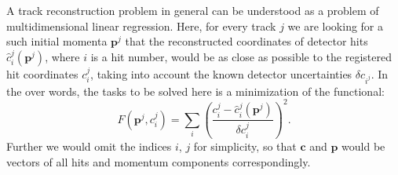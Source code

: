 %
%

A track reconstruction  problem in general can be understood as a problem of multidimensional linear regression.
Here, for every track $j$ we are looking for a such initial momenta $\boldsymbol{p}^j$ that the reconstructed coordinates of detector 
hits $\hat{c}_i^j(\boldsymbol{p}^j)$, where $i$ is a hit number, would be as close as possible to the registered hit coordinates $c_i^j$, 
taking into account the known detector uncertainties $\delta c_{i^j}$.
In the over words, the tasks to be solved here is a minimization of the functional:
\begin{equation}
\label{track_fit}
F(\boldsymbol{p}^j, c_i^j) = \sum_i \left(\frac{c_i^j - \hat{c}_i^j(\boldsymbol{p}^j)}{\delta c_i^j}\right)^2.
\end{equation}
Further we would omit the indices $i$, $j$ for simplicity, so that $\boldsymbol{c}$ and $\boldsymbol{p}$ would be vectors of all hits and momentum components correspondingly.

